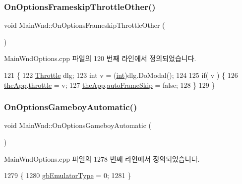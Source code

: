 \subsubsection{\texorpdfstring{On\+Options\+Frameskip\+Throttle\+Other()}{OnOptionsFrameskipThrottleOther()}}
{\footnotesize\ttfamily void Main\+Wnd\+::\+On\+Options\+Frameskip\+Throttle\+Other (\begin{DoxyParamCaption}{ }\end{DoxyParamCaption})\hspace{0.3cm}{\ttfamily [protected]}}



Main\+Wnd\+Options.\+cpp 파일의 120 번째 라인에서 정의되었습니다.


\begin{DoxyCode}
121 \{
122     \mbox{\hyperlink{class_throttle}{Throttle}} dlg;
123     \textcolor{keywordtype}{int} v = (\mbox{\hyperlink{_util_8cpp_a0ef32aa8672df19503a49fab2d0c8071}{int}})dlg.DoModal();
124     
125     \textcolor{keywordflow}{if}( v ) \{
126         \mbox{\hyperlink{_v_b_a_8cpp_a8095a9d06b37a7efe3723f3218ad8fb3}{theApp}}.\mbox{\hyperlink{class_v_b_a_af21b98509a2589b38e4787f065b40a2b}{throttle}} = v;
127         \mbox{\hyperlink{_v_b_a_8cpp_a8095a9d06b37a7efe3723f3218ad8fb3}{theApp}}.\mbox{\hyperlink{class_v_b_a_a9ecbee7d82db73b24aee3afb66128388}{autoFrameSkip}} = \textcolor{keyword}{false};
128     \}
129 \}
\end{DoxyCode}
\mbox{\label{class_main_wnd_ab3133ad26d9d8f243c32c3243e8b28d9}} 
\subsubsection{\texorpdfstring{On\+Options\+Gameboy\+Automatic()}{OnOptionsGameboyAutomatic()}}
{\footnotesize\ttfamily void Main\+Wnd\+::\+On\+Options\+Gameboy\+Automatic (\begin{DoxyParamCaption}{ }\end{DoxyParamCaption})\hspace{0.3cm}{\ttfamily [protected]}}



Main\+Wnd\+Options.\+cpp 파일의 1278 번째 라인에서 정의되었습니다.


\begin{DoxyCode}
1279 \{
1280   \mbox{\hyperlink{gb_globals_8cpp_aab449ed6ecf2bd502928a3d5aa5c54c4}{gbEmulatorType}} = 0;
1281 \}
\end{DoxyCode}
\mbox{\label{class_main_wnd_a8fce3257c75cb141371c422adbcb5fd1}} 
